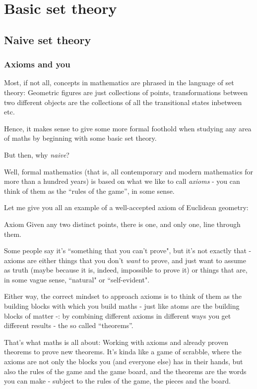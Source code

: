 \chapter{Basic set theory}
\section{Naive set theory}
\subsection{Axioms and you}

Most, if not all, concepts in mathematics are phrased in the language of set theory: Geometric figures are just collections of points, transformations between two different objects are the collections of all the transitional states inbetween etc.

Hence, it makes sense to give some more formal foothold when studying any area of maths by beginning with some basic set theory.

But then, why \textit{naive}?

Well, formal mathematics (that is, all contemporary and modern mathematics for more than a hundred years) is based on what we like to call \textit{axioms} - you can think of them as the ``rules of the game'', in some sense.

Let me give you all an example of a well-accepted axiom of Euclidean geometry:

\begin{blockenv}{Axiom}
	Given any two distinct points, there is one, and only one, line through them.
\end{blockenv}

Some people say it's ``something that you can't prove", but it's not exactly that - axioms are either things that you don't \textit{want} to prove, and just want to assume as truth (maybe because it is, indeed, impossible to prove it) or things that are, in some vague sense, ``natural" or ``self-evident".

Either way, the correct mindset to approach axioms is to think of them as the building blocks with which you build maths - just like atoms are the building blocks of matter -: by combining different axioms in different ways you get different results - the so called ``theorems''.

That's what maths is all about: Working with axioms and already proven theorems to prove new theorems. It's kinda like a game of scrabble, where the axioms are not only the blocks you (and everyone else) has in their hands, but also the rules of the game and the game board, and the theorems are the words you can make - subject to the rules of the game, the pieces and the board.

